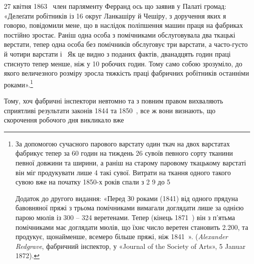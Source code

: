 27 квітня 1863~ член парляменту Ферранд ось що заявив у
Палаті громад: «Делеґати робітників із 16 округ Ланкашіру й
Чешіру, з доручення яких я говорю, повідомили мене, що в наслідок
поліпшення машин праця на фабриках постійно зростає.
Раніш одна особа з помічниками обслуговувала два ткацькі верстати,
тепер одна особа без помічників обслуговує три варстати,
а часто-густо й чотири варстати і~ Як це видно з поданих
фактів, дванадцять годин праці стиснуто тепер менше, ніж у
10 робочих годин. Тому само собою зрозуміло, до якого величезного
розміру зросла тяжкість праці фабричних робітників останніми
роками».\footnote{
За допомогою сучасного парового варстату один ткач на двох
варстатах фабрикує тепер за 60 годин на тиждень 26 сувоїв певного сорту
тканини певної довжини та ширини, а раніш на старому паровому ткацькому
варстаті він міг продукувати лише 4 такі сувої. Витрати на ткання
одного такого сувою вже на початку 1850-х років спали з 2
9 до 5

Додаток до другого видання: «Перед З0 роками (1841) від одного прядуна
бавовняної пряжі з трьома помічниками вимагали доглядати лише
за однією парою мюлів із 300 – 324 веретенами. Тепер (кінець 1871~)
він з п’ятьма помічниками має доглядати мюлів, що їхнє число веретен
становить \num{2.200}, та продукує, щонайменше, всемеро більше пряжі, ніж
1841~». (\emph{Alexander Redgrave}, фабричний інспектор, у «Journal of
the Society of Arts», 5 Januar 1872).
}

Тому, хоч фабричні інспектори невтомно та з повним правом
вихваляють сприятливі результати законів 1844 та 1850~,
все ж вони визнають, що скорочення робочого дня викликало вже
\parbreak{}  %
